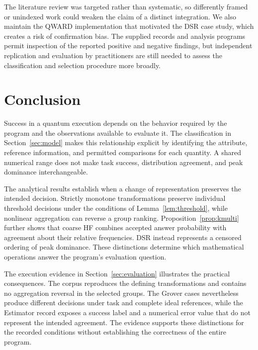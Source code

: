 \documentclass[10pt,conference]{IEEEtran}
\begin{document}
The literature review was targeted rather than systematic, so differently framed or unindexed work could weaken the claim of a distinct integration. We also maintain the QWARD implementation that motivated the DSR case study, which creates a risk of confirmation bias. The supplied records and analysis programs permit inspection of the reported positive and negative findings, but independent replication and evaluation by practitioners are still needed to assess the classification and selection procedure more broadly.

\section{Conclusion}
\label{sec:conclusion}

Success in a quantum execution depends on the behavior required by the program and the observations available to evaluate it. The classification in Section~\ref{sec:model} makes this relationship explicit by identifying the attribute, reference information, and permitted comparisons for each quantity. A shared numerical range does not make task success, distribution agreement, and peak dominance interchangeable.

The analytical results establish when a change of representation preserves the intended decision. Strictly monotone transformations preserve individual threshold decisions under the conditions of Lemma~\ref{lem:threshold}, while nonlinear aggregation can reverse a group ranking. Proposition~\ref{prop:kmulti} further shows that coarse HF combines accepted answer probability with agreement about their relative frequencies. DSR instead represents a censored ordering of peak dominance. These distinctions determine which mathematical operations answer the program's evaluation question.

The execution evidence in Section~\ref{sec:evaluation} illustrates the practical consequences. The corpus reproduces the defining transformations and contains no aggregation reversal in the selected groups. The Grover cases nevertheless produce different decisions under task and complete ideal references, while the Estimator record exposes a success label and a numerical error value that do not represent the intended agreement. The evidence supports these distinctions for the recorded conditions without establishing the correctness of the entire program.
\end{document}
